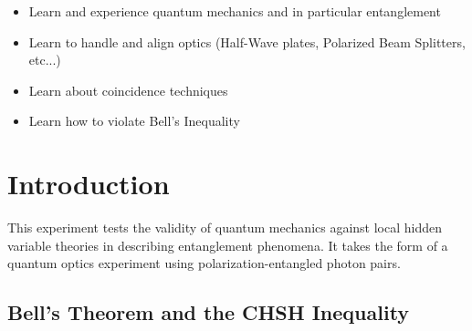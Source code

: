 \documentclass{../lab}
\begin{document}
\begin{itemize}
    \item Learn and experience quantum mechanics and in particular entanglement

    \item Learn to handle and align optics (Half-Wave plates, Polarized Beam Splitters, etc...)

    \item Learn about coincidence techniques

    \item Learn how to violate Bell's Inequality

\end{itemize}

\section{Introduction}
\label{sec:Introduction}

This experiment tests the validity of quantum mechanics against local hidden variable theories in describing entanglement phenomena. It takes the form of a quantum optics experiment using polarization-entangled photon pairs.

\subsection{Bell's Theorem and the CHSH Inequality}
\end{document}

